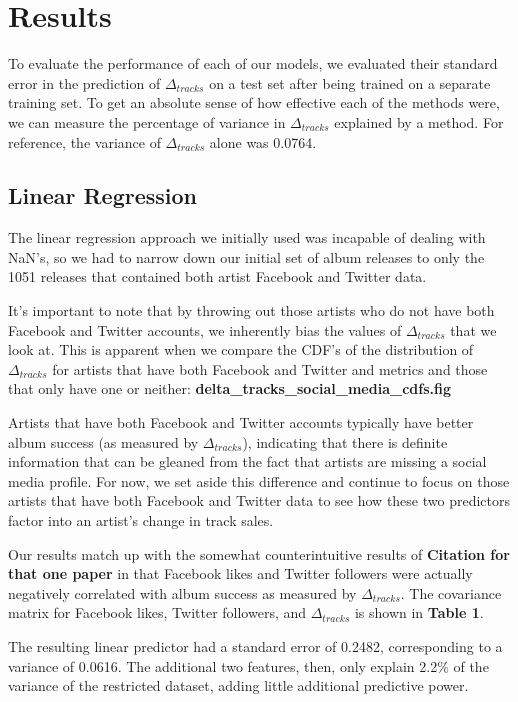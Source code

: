 \documentclass[conference]{IEEEtran}
\begin{document}
\section{Results}
To evaluate the performance of each of our models, we evaluated their standard error in the prediction of $\Delta_{tracks}$ on a test set after being trained on a separate training set. To get an absolute sense of how effective each of the methods were, we can measure the percentage of variance in $\Delta_{tracks}$ explained by a method. For reference, the variance of $\Delta_{tracks}$ alone was 0.0764.
\subsection{Linear Regression}
The linear regression approach we initially used was incapable of dealing with NaN's, so we had to narrow down our initial set of album releases to only the 1051 releases that contained both artist Facebook and Twitter data.

It's important to note that by throwing out those artists who do not have both Facebook and Twitter accounts, we inherently bias the values of $\Delta_{tracks}$ that we look at. This is apparent when we compare the CDF's of the distribution of $\Delta_{tracks}$ for artists that have both Facebook and Twitter and metrics and those that only have one or neither: \textbf{delta\_tracks\_social\_media\_cdfs.fig}

Artists that have both Facebook and Twitter accounts typically have better album success (as measured by $\Delta_{tracks}$), indicating that there is definite information that can be gleaned from the fact that artists are missing a social media profile. For now, we set aside this difference and continue to focus on those artists that have both Facebook and Twitter data to see how these two predictors factor into an artist's change in track sales.

Our results match up with the somewhat counterintuitive results of \textbf{Citation for that one paper} in that Facebook likes and Twitter followers were actually negatively correlated with album success as measured by $\Delta_{tracks}$. The covariance matrix for Facebook likes, Twitter followers, and $\Delta_{tracks}$ is shown in \textbf{Table 1}.

The resulting linear predictor had a standard error of 0.2482, corresponding to a variance of 0.0616. The additional two features, then, only explain 2.2\% of the variance of the restricted dataset, adding little additional predictive power.
\end{document}
